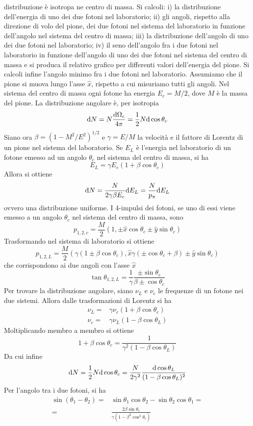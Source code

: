 \documentclass{article}
\begin{document}
\begin{enumerate}
{	distribuzione è isotropa ne centro di massa. Si calcoli: i) la distribuzione
	dell’energia di uno dei due fotoni nel laboratorio; ii) gli angoli, rispetto alla
	direzione di volo del pione, dei due fotoni nel sistema del laboratorio in funzione
	dell’angolo nel sistema del centro di massa; iii) la distribuzione dell’angolo di
	uno dei due fotoni nel laboratorio; iv) il seno dell’angolo fra i due fotoni nel
	laboratorio in funzione dell’angolo di uno dei due fotoni nel sistema del centro di
	massa e si produca il relativo grafico per differenti valori dell’energia del pione.
	Si calcoli infine l’angolo minimo fra i due fotoni nel laboratorio.} Assumiamo che il pione si muova lungo l'asse $\hat{x}$, rispetto a cui misuriamo tutti gli angoli. Nel sistema del centro di massa ogni fotone ha energia $E_c=M/2$, dove $M$ è la massa del pione. La distribuzione angolare è, per isotropia
\[\mathrm{d} N=N\frac{\mathrm{d} \Omega_c}{4\pi}=\frac{1}{2}N\mathrm{d} \cos\theta_c\]
Siano ora $\beta=(1-M^2/E^2)^{1/2}$ e $\gamma=E/M$ la velocità e il fattore di Lorentz di un pione nel sistema del laboratorio. Se $E_L$ è l'energia nel laboratorio di un fotone emesso ad un angolo $\theta_c$ nel sistema del centro di massa, si ha
\[E_L=\gamma E_c(1+\beta\cos\theta_c)\]
Allora si ottiene
\[\mathrm{d} N=\frac{N}{2\gamma\beta E_c}\mathrm{d} E_L=\frac{N}{p_\pi}\mathrm{d} E_L\]
ovvero una distribuzione uniforme. I 4-impulsi dei fotoni, se uno di essi viene emesso a un angolo $\theta_c$ nel sistema del centro di massa, sono
\[p_{1,2,c}=\frac{M}{2}\left(1,\pm\hat{x}\cos\theta_c\pm\hat{y}\sin\theta_c\right)\]
Trasformando nel sistema di laboratorio si ottiene 
\[p_{1,2,L}=\frac{M}{2}\left(\gamma(1\pm\beta\cos\theta_c),\hat{x}\gamma(\pm\cos\theta_c+\beta)\pm\hat{y}\sin\theta_c\right)\]
che corrispondono ai due angoli con l'asse $\hat{x}$
\[\tan\theta_{1,2,L}=\frac{1}{\gamma}\frac{\pm\sin\theta_c}{\beta\pm \cos\theta_c}\]
Per trovare la distribuzione angolare, siano $\nu_L$ e $\nu_c$ le frequenze di un fotone nei due sistemi. Allora dalle trasformazioni di Lorentz si ha
\begin{align*}
	\nu_L=&\gamma\nu_c(1+\beta\cos\theta_c)\\\nu_c=&\gamma\nu_L(1-\beta\cos\theta_L)
\end{align*}
Moltiplicando membro a membro si ottiene
\[1+\beta\cos\theta_c=\frac{1}{\gamma^2(1-\beta\cos\theta_L)}\]
Da cui infine
\[\mathrm{d} N=\frac{1}{2}N\mathrm{d} \cos\theta_c=\frac{N}{2\gamma^2}\frac{\mathrm{d} \cos\theta_L}{(1-\beta\cos\theta_L)^2}\]
Per l'angolo tra i due fotoni, si ha
\begin{align*}\sin(\theta_1-\theta_2)=&\sin\theta_1\cos\theta_2-\sin\theta_2\cos\theta_1=\\=&\frac{2\beta\sin\theta_c}{\gamma(1-\beta^2\cos^2\theta_c)}\end{align*}

\end{enumerate}
\end{document}
